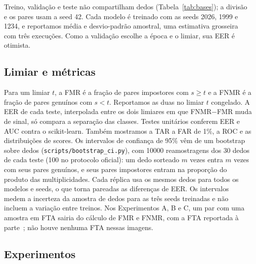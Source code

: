 \documentclass[conference]{IEEEtran}
\newcommand{\BootN}{\num{10000}}
\begin{document}
Treino, validação e teste não compartilham dedos (Tabela~\ref{tab:bases}); a divisão e os pares usam a seed 42. Cada modelo é treinado com as seeds 2026, 1999 e 1234, e reportamos média e desvio-padrão amostral, uma estimativa grosseira com três execuções. Como a validação escolhe a época e o limiar, sua EER é otimista.

\subsection{Limiar e métricas}

Para um limiar $t$, a FMR é a fração de pares impostores com $s\ge t$ e a FNMR é a fração de pares genuínos com $s<t$. Reportamos as duas no limiar $t$ congelado. A EER de cada teste, interpolada entre os dois limiares em que FNMR$-$FMR muda de sinal, só compara a separação das classes. Testes unitários conferem EER e AUC contra o scikit-learn. Também mostramos a TAR a FAR de 1\%, a ROC e as distribuições de scores. Os intervalos de confiança de 95\% vêm de um bootstrap sobre dedos (\texttt{scripts/bootstrap\_ci.py}), com \BootN{} reamostragens dos 30 dedos de cada teste (100 no protocolo oficial): um dedo sorteado $m$ vezes entra $m$ vezes com seus pares genuínos, e seus pares impostores entram na proporção do produto das multiplicidades. Cada réplica usa os mesmos dedos para todos os modelos e seeds, o que torna pareadas as diferenças de EER. Os intervalos medem a incerteza da amostra de dedos para as três seeds treinadas e não incluem a variação entre treinos. Nos Experimentos A, B e C, um par com uma amostra em FTA sairia do cálculo de FMR e FNMR, com a FTA reportada à parte~\cite{iso19795-1}; não houve nenhuma FTA nessas imagens.

\subsection{Experimentos}
\end{document}
